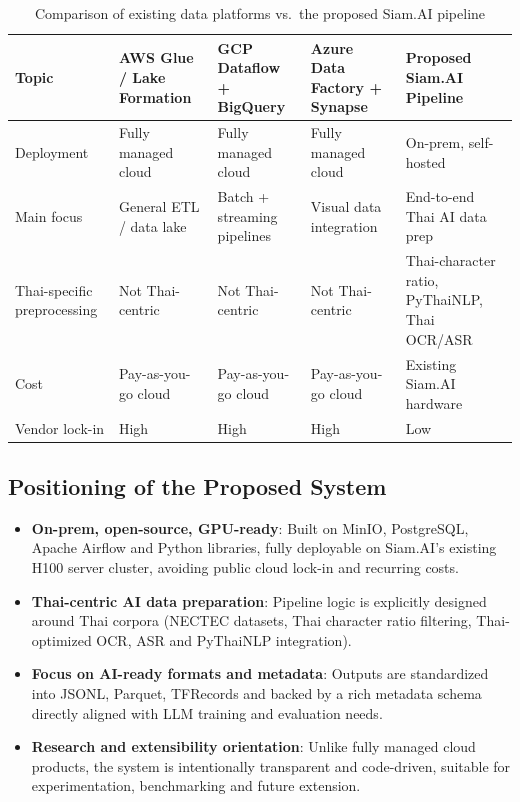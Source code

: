 \documentclass[12pt,oneside,openright,a4paper]{cpe-english-project}
\begin{document}
\begin{table}[H]
\centering
\caption{Comparison of existing data platforms vs.\ the proposed Siam.AI pipeline}\label{tbl:platform-compare}
\small
\begin{tabular}{|p{}|p{}|p{}|p{}|p{}|}
\hline
\textbf{Topic} & \textbf{AWS Glue / Lake Formation} & \textbf{GCP Dataflow + BigQuery} & \textbf{Azure Data Factory + Synapse} & \textbf{Proposed Siam.AI Pipeline} \\ \hline
Deployment & Fully managed cloud & Fully managed cloud & Fully managed cloud & On-prem, self-hosted \\ \hline
Main focus & General ETL / data lake & Batch + streaming pipelines & Visual data integration & End-to-end Thai AI data prep \\ \hline
Thai-specific preprocessing & Not Thai-centric & Not Thai-centric & Not Thai-centric & Thai-character ratio, PyThaiNLP, Thai OCR/ASR \\ \hline
Cost & Pay-as-you-go cloud & Pay-as-you-go cloud & Pay-as-you-go cloud & Existing Siam.AI hardware \\ \hline
Vendor lock-in & High & High & High & Low \\ \hline
\end{tabular}
\end{table}

\subsection{Positioning of the Proposed System}

\begin{itemize}
\item \textbf{On-prem, open-source, GPU-ready}: Built on MinIO, PostgreSQL, Apache Airflow and Python libraries, fully deployable on Siam.AI's existing H100 server cluster, avoiding public cloud lock-in and recurring costs.
\item \textbf{Thai-centric AI data preparation}: Pipeline logic is explicitly designed around Thai corpora (NECTEC datasets, Thai character ratio filtering, Thai-optimized OCR, ASR and PyThaiNLP integration).
\item \textbf{Focus on AI-ready formats and metadata}: Outputs are standardized into JSONL, Parquet, TFRecords and backed by a rich metadata schema directly aligned with LLM training and evaluation needs.
\item \textbf{Research and extensibility orientation}: Unlike fully managed cloud products, the system is intentionally transparent and code-driven, suitable for experimentation, benchmarking and future extension.
\end{itemize}
\end{document}
